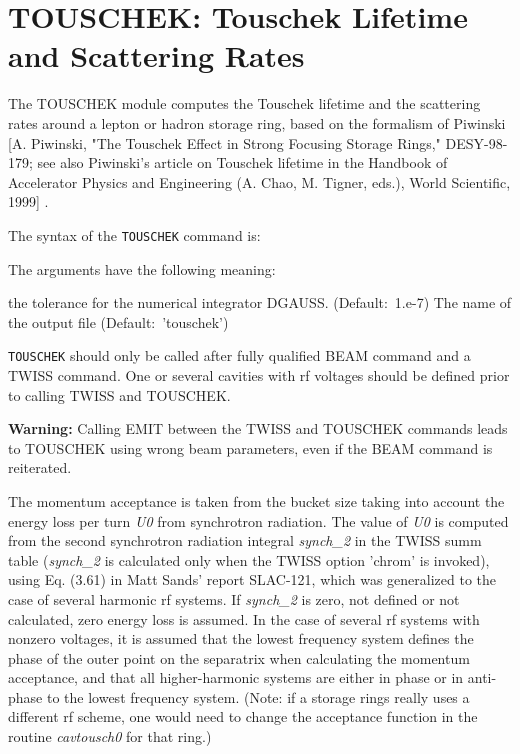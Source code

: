 
\chapter{TOUSCHEK: Touschek Lifetime and Scattering Rates}

The TOUSCHEK module computes the Touschek lifetime and the scattering rates 
around a lepton or hadron storage ring, based on the formalism of Piwinski [A. 
Piwinski, "The Touschek Effect in Strong Focusing Storage Rings," DESY-98-179; 
see also Piwinski's article on Touschek lifetime in the Handbook of Accelerator 
Physics and Engineering (A. Chao, M. Tigner, eds.), World Scientific, 1999] .

The syntax of the \texttt{TOUSCHEK} command is: 

The arguments have the following meaning: 
\begin{madlist}
    the tolerance for the numerical integrator
   DGAUSS. (Default:~1.e-7) 
    The name of the output file (Default:~'touschek') 
\end{madlist}

\texttt{TOUSCHEK} should only be called after fully qualified BEAM command and a TWISS
command. One or several cavities with rf voltages should be defined
prior to calling TWISS and TOUSCHEK. 

{\bf Warning:} Calling EMIT between the TWISS and TOUSCHEK commands
leads to TOUSCHEK using wrong beam parameters, even if the BEAM command
is reiterated. 
 
The momentum acceptance is taken from the bucket size taking into
account the  energy loss per turn \textit{U0} from synchrotron
radiation. The value of \textit{U0} is computed from the second
synchrotron radiation integral \textit{synch\_2} in the TWISS summ table
(\textit{synch\_2} is calculated only when the TWISS option 'chrom' is
invoked), using Eq. (3.61) in Matt Sands' report SLAC-121, which was
generalized to the case of several harmonic rf systems. 
If \textit{synch\_2} is zero, not defined or not calculated, zero energy
loss is assumed. In the case of several rf systems with nonzero
voltages, it is assumed that the lowest frequency system defines the
phase of the outer point on the separatrix when calculating the momentum
acceptance, and that all higher-harmonic systems are either in phase or
in anti-phase to the lowest frequency system. (Note: if a storage rings
really uses a different rf scheme, one would need to change the
acceptance function in the routine \textit{cavtousch0} for that ring.) 


